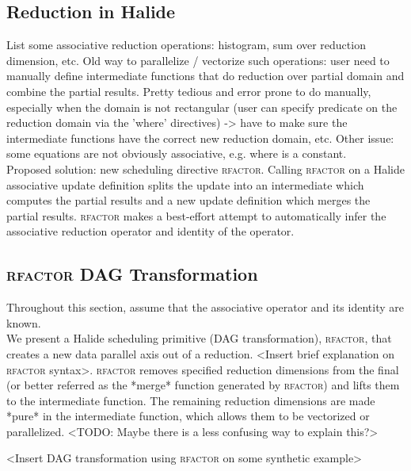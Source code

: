 \subsection{Reduction in Halide}

List some associative reduction operations: histogram, sum over reduction dimension, etc. Old way to parallelize / vectorize such operations: user need to manually define intermediate functions that do reduction over partial domain and combine the partial results. Pretty tedious and error prone to do manually, especially when the domain is not rectangular (user can specify predicate on the reduction domain via the 'where' directives) -> have to make sure the intermediate functions have the correct new reduction domain, etc. Other issue: some equations are not obviously associative, e.g.  where  is a constant. \\

Proposed solution: new scheduling directive \textsc{rfactor}. Calling \textsc{rfactor} on a Halide associative update definition splits the update into an intermediate which computes the partial results and a new update definition which merges the partial results. \textsc{rfactor} makes a best-effort attempt to automatically infer the associative reduction operator and identity of the operator.

\subsection{\textsc{rfactor} DAG Transformation}

Throughout this section, assume that the associative operator and its identity are known. \\

We present a Halide scheduling primitive (DAG transformation), \textsc{rfactor}, that creates a new data parallel axis out of a reduction. <Insert brief explanation on \textsc{rfactor} syntax>. \textsc{rfactor} removes specified reduction dimensions from the final (or better referred as the *merge* function generated by \textsc{rfactor}) and lifts them to the intermediate function. The remaining reduction dimensions are made *pure* in the intermediate function, which allows them to be vectorized or parallelized. <TODO: Maybe there is a less confusing way to explain this?>

<Insert DAG transformation using \textsc{rfactor} on some synthetic example> \\

